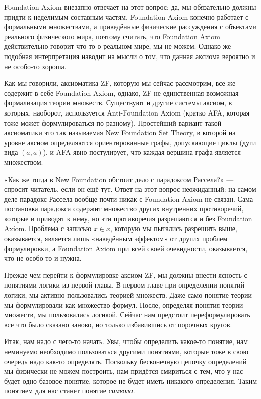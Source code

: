 Foundation Axiom внезапно отвечает на этот вопрос: да, мы обязательно должны придти к неделимым составным частям. Foundation Axiom конечно работает с формальными множествами, а приведённые физические рассуждения с объектами реального физического мира, поэтому считать, что Foundation Axiom действительно говорит что-то о реальном мире, мы не можем. Однако же подобная интерпретация наводит на мысли о том, что данная аксиома вероятно и не особо-то хороша.

Как мы говорили, аксиоматика ZF, которую мы сейчас рассмотрим, все же содержит в себе Foundation Axiom, однако, ZF не единственная возможная формализация теории множеств. Существуют и другие системы аксиом, в которых, наоборот, используется Anti-Foundation Axiom (кратко AFA, которая тоже может формулироваться по-разному). Простейший вариант такой аксиоматики это так называемая New Foundation Set Theory, в которой на уровне аксиом определяются ориентированные графы, допускающие циклы (дуги вида $(a, a)$), и AFA явно постулирует, что каждая вершина графа является множеством.

«Как же тогда в New Foundation обстоит дело с парадоксом Рассела?» — спросит читатель, если он ещё тут. Ответ на этот вопрос неожиданный: на самом деле парадокс Рассела вообще почти никак с Foundation Axiom не связан. Сама постановка парадокса содержит множество других внутренних противоречий, которые и приводят к нему, но эти противоречия разрешаются и без Foundation Axiom. Проблема с записью $x\in x$, которую мы пытались разрешить выше, оказывается, является лишь «наведённым эффектом» от других проблем формулировки, а Foundation Axiom при всей своей очевидности, оказывается, что не особо-то и нужна.

Прежде чем перейти к формулировке аксиом ZF, мы должны внести ясность с понятиями логики из первой главы. В первом главе при определении понятий логики, мы активно пользовались теорией множеств. Даже само понятие теории мы формулировали как множество формул. После, определяя понятия теории множеств, мы пользовались логикой. Сейчас нам предстоит переформулировать все что было сказано заново, но только избавившись от порочных кругов.

Итак, нам надо с чего-то начать. Увы, чтобы определить какое-то понятие, нам неминуемо необходимо пользоваться другими понятиями, которые тоже в свою очередь надо как-то определять. Поскольку бесконечную цепочку определений мы физически не можем построить, нам придётся смириться с тем, что у нас будет одно базовое понятие, которое не будет иметь никакого определения. Таким понятием для нас станет понятие {\slshape символа}.

